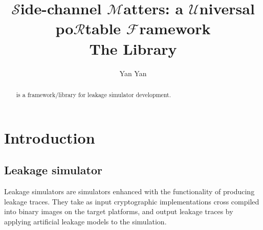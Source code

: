 \documentclass[]{report}
\title{$\mathcal{S}$ide-channel $\mathcal{M}$atters: a $\mathcal{U}$niversal po$\mathcal{R}$table $\mathcal{F}$ramework\\ The \smurf Library}
\author{Yan Yan}
\begin{document}
\maketitle

\begin{abstract}
	\smurf is a framework/library for leakage simulator development.
\end{abstract}


\tableofcontents


\chapter{Introduction}

\section{Leakage simulator}
Leakage simulators are simulators enhanced with the functionality of producing leakage traces. They take as input cryptographic implementations cross compiled into binary images on the target platforms, and output leakage traces by applying artificial leakage models to the simulation.
\end{document}
